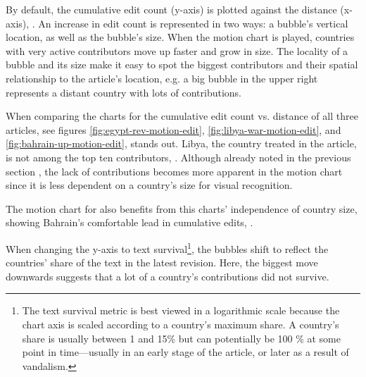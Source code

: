 
By default, the cumulative edit count (y-axis) is plotted against the distance (x-axis), .
An increase in edit count is represented in two ways: a bubble's vertical location, as well as the bubble's size.
When the motion chart is played, countries with very active contributors move up faster and grow in size. 
The locality of a bubble and its size make it easy to spot the biggest contributors and their spatial relationship to the article's location, e.g. a big bubble in the upper right represents a distant country with lots of contributions. 


When comparing the charts for the cumulative edit count vs. distance of all three articles, see figures \ref{fig:egypt-rev-motion-edit}, \ref{fig:libya-war-motion-edit}, and \ref{fig:bahrain-up-motion-edit},  stands out.
Libya, the country treated in the article, is not among the top ten contributors, .
Although already noted in the previous section , the lack of contributions becomes more apparent in the motion chart since it is less dependent on a country's size for visual recognition.

The motion chart for  also benefits from this charts' independence of country size, showing Bahrain's comfortable lead in cumulative edits, .


When changing the y-axis to text survival\footnote{The text survival metric is best viewed in a logarithmic scale because the chart axis is scaled according to a country's maximum share. A country's share is usually between 1 and 15\% but  can potentially be 100 \% at some point in time---usually in an early stage of the article, or later as a result of vandalism.}, the bubbles shift to reflect the countries' share of the text in the latest revision.
Here, the biggest move downwards suggests that a lot of a country's contributions did not survive.


